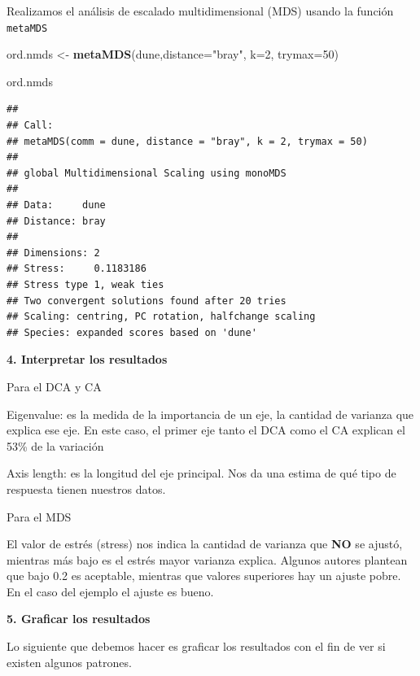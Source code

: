 \documentclass[]{book}
\newenvironment{Shaded}{\begin{snugshade}}{\end{snugshade}}
\newcommand{\KeywordTok}[1]{\textcolor[rgb]{0.13,0.29,0.53}{\textbf{{#1}}}}
\newcommand{\DataTypeTok}[1]{\textcolor[rgb]{0.13,0.29,0.53}{{#1}}}
\newcommand{\DecValTok}[1]{\textcolor[rgb]{0.00,0.00,0.81}{{#1}}}
\newcommand{\StringTok}[1]{\textcolor[rgb]{0.31,0.60,0.02}{{#1}}}
\newcommand{\NormalTok}[1]{{#1}}
\begin{document}
Realizamos el análisis de escalado multidimensional (MDS) usando la
función \texttt{metaMDS}

\begin{Shaded}
\begin{Highlighting}[]
\NormalTok{ord.nmds <-}\StringTok{ }\KeywordTok{metaMDS}\NormalTok{(dune,}\DataTypeTok{distance=}\StringTok{"bray"}\NormalTok{, }\DataTypeTok{k=}\DecValTok{2}\NormalTok{, }\DataTypeTok{trymax=}\DecValTok{50}\NormalTok{)   }
\end{Highlighting}
\end{Shaded}

\begin{Shaded}
\begin{Highlighting}[]
\NormalTok{ord.nmds }
\end{Highlighting}
\end{Shaded}

\begin{verbatim}
## 
## Call:
## metaMDS(comm = dune, distance = "bray", k = 2, trymax = 50) 
## 
## global Multidimensional Scaling using monoMDS
## 
## Data:     dune 
## Distance: bray 
## 
## Dimensions: 2 
## Stress:     0.1183186 
## Stress type 1, weak ties
## Two convergent solutions found after 20 tries
## Scaling: centring, PC rotation, halfchange scaling 
## Species: expanded scores based on 'dune'
\end{verbatim}

\textbf{4. Interpretar los resultados}

Para el DCA y CA

Eigenvalue: es la medida de la importancia de un eje, la cantidad de
varianza que explica ese eje. En este caso, el primer eje tanto el DCA
como el CA explican el 53\% de la variación

Axis length: es la longitud del eje principal. Nos da una estima de qué
tipo de respuesta tienen nuestros datos.

Para el MDS

El valor de estrés (stress) nos indica la cantidad de varianza que
\textbf{NO} se ajustó, mientras más bajo es el estrés mayor varianza
explica. Algunos autores plantean que bajo 0.2 es aceptable, mientras
que valores superiores hay un ajuste pobre. En el caso del ejemplo el
ajuste es bueno.

\textbf{5. Graficar los resultados}

Lo siguiente que debemos hacer es graficar los resultados con el fin de
ver si existen algunos patrones.
\end{document}
